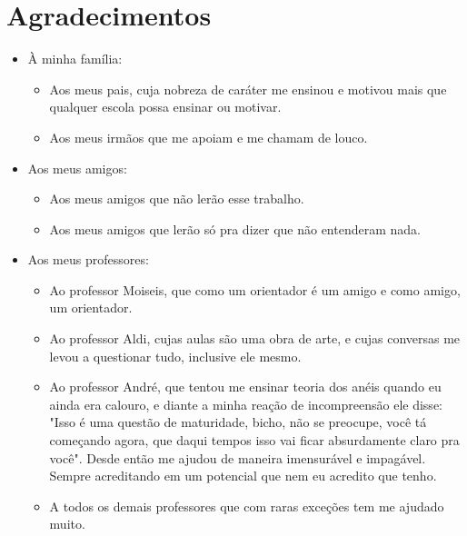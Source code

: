%

\chapter*{Agradecimentos}

\begin{itemize}
\item À minha família:

\begin{itemize}
\item Aos meus pais, cuja nobreza de caráter me ensinou e motivou mais que qualquer escola possa ensinar ou motivar.
\item Aos meus irmãos que me apoiam e me chamam de louco.
\end{itemize}

\item Aos meus amigos:

\begin{itemize}
\item Aos meus amigos que não lerão esse trabalho.
\item Aos meus amigos que lerão só pra dizer que não entenderam nada.
\end{itemize}

\item Aos meus professores:

\begin{itemize}
\item Ao professor Moiseis, que como um orientador é um amigo e como amigo, um orientador.
\item Ao professor Aldi, cujas aulas são uma obra de arte, e cujas conversas me levou a questionar tudo, inclusive ele mesmo. 
\item Ao professor André, que tentou me ensinar teoria dos anéis quando eu ainda era calouro, e diante a minha reação de incompreensão ele disse: "Isso é uma questão de maturidade, bicho, não se preocupe, você tá começando agora, que daqui tempos isso vai ficar absurdamente claro pra você". Desde então me ajudou de maneira imensurável e impagável. Sempre acreditando em um potencial que nem eu acredito que tenho.
\item A todos os demais professores que com raras exceções tem me ajudado muito.


\end{itemize}

\end{itemize}



%